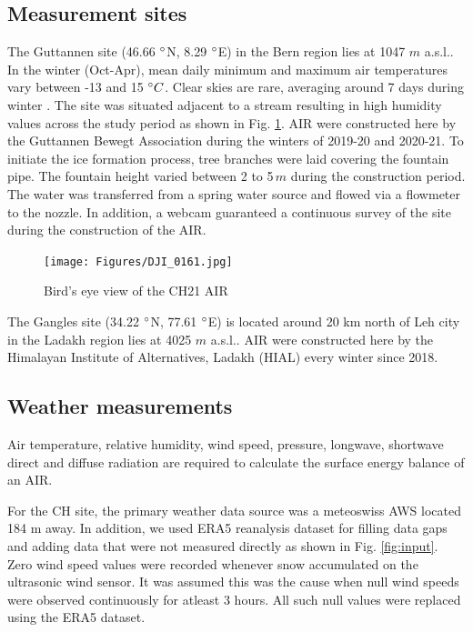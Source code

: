 \documentclass[utf8]{frontiersSCNS} %
\begin{document}
\subsection{Measurement sites}

The Guttannen site (46.66 $\degree$N, 8.29 $\degree$E) in the Bern region lies at 1047 $m$ a.s.l.. In the winter (Oct-Apr), mean
daily minimum and maximum air temperatures vary between -13 and 15 $\degree C$. Clear skies are rare, averaging around 7
days during winter \citep{eispalast}. The site was situated adjacent to a stream resulting in high humidity values
across the study period as shown in Fig. \ref{fig:CHsite}. AIR were constructed here by the Guttannen Bewegt Association
during the winters of 2019-20 and 2020-21. To initiate the ice formation process, tree branches were laid covering the
fountain pipe.  The fountain height varied between 2 to 5\,$m$ during the construction period. The water was transferred
from a spring water source and flowed via a flowmeter to the nozzle. In addition, a webcam guaranteed a continuous
survey of the site during the construction of the AIR.

\begin{figure} 
    \begin{center} 
        \texttt{[image: Figures/DJI\_0161.jpg]} 
    \end{center} 
\caption{Bird's eye view of the CH21 AIR} 
\label{fig:CHsite} 
\end{figure}


The Gangles site (34.22 $\degree$N, 77.61 $\degree$E) is located around 20 km north of Leh city in the Ladakh region
lies at 4025 $m$ a.s.l.. AIR were constructed here by the Himalayan Institute of Alternatives, Ladakh (HIAL) every
winter since 2018.

\subsection{Weather measurements} 
Air temperature, relative humidity, wind speed, pressure, longwave, shortwave direct and diffuse radiation are required
to calculate the surface energy balance of an AIR. 

For the CH site, the primary weather data source was a meteoswiss AWS located 184 m away. In addition, we used ERA5
reanalysis dataset \citep{era5} for filling data gaps and adding data that were not measured directly as shown in Fig.
\ref{fig:input}. Zero wind speed values were recorded whenever snow accumulated on the ultrasonic wind sensor. It was
assumed this was the cause when null wind speeds were observed continuously for atleast 3 hours. All such null values
were replaced using the ERA5 dataset. 
\end{document}
